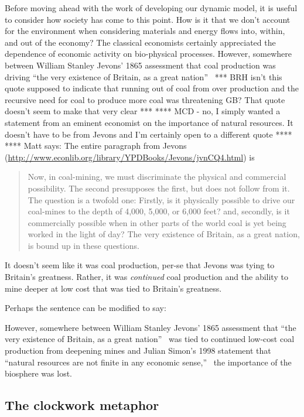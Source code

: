 Before moving ahead with the work of developing our dynamic model,
it is useful to consider how society has come to this point.
How is it that we don't account for the environment when 
considering materials and energy flows into, within, and out of the economy?
The classical economists certainly appreciated the dependence of
economic activity on bio-physical processes.\cite{Cleveland1987, Hall2011, Dale2012}
However, somewhere between William Stanley Jevons' 1865
assessment that
coal production was driving ``the very existence of Britain, 
as a great nation''~\cite[IV.3]{Jevons1865}
*** BRH isn't this quote supposed to indicate that running out of coal from over production
and the recursive need for coal to produce more coal
was threatening GB? That quote doesn't seem to make that very clear ***
**** MCD - no, I simply wanted a statement from an eminent economist on the importance of natural resources.
It doesn't have to be from Jevons and I'm certainly open to a different quote ****
**** Matt says: The entire paragraph from Jevons (\url{http://www.econlib.org/library/YPDBooks/Jevons/jvnCQ4.html}) is
\begin{quote}
	Now, in coal-mining, we must discriminate the physical and commercial possibility. 
	The second presupposes the first, but does not follow from it. 
	The question is a twofold one:
	Firstly, is it physically possible to drive our coal-mines 
	to the depth of 4,000, 5,000, or 6,000 feet? 
	and, secondly, is it commercially possible when 
	in other parts of the world coal is yet being worked in the light of day? 
	The very existence of Britain, as a great nation, is bound up in these questions.
\end{quote}
It doesn't seem like it was coal production, per-se that Jevons was tying
to Britain's greatness.
Rather, it was \emph{continued} coal production and the ability to mine deeper
at low cost that was tied to Britain's greatness.

Perhaps the sentence can be modified to say:

However, somewhere between William Stanley Jevons' 1865
assessment that
``the very existence of Britain, as a great nation''~\cite[IV.3]{Jevons1865}
was tied to continued low-cost coal production from deepening mines
and Julian Simon's 1998 statement that
``natural resources are not finite in any economic sense,''~\cite[p.~54]{Simon1998} %
the importance of the biosphere was lost.


\subsection{The clockwork metaphor}
\label{sec:clockwork_metaphor}

